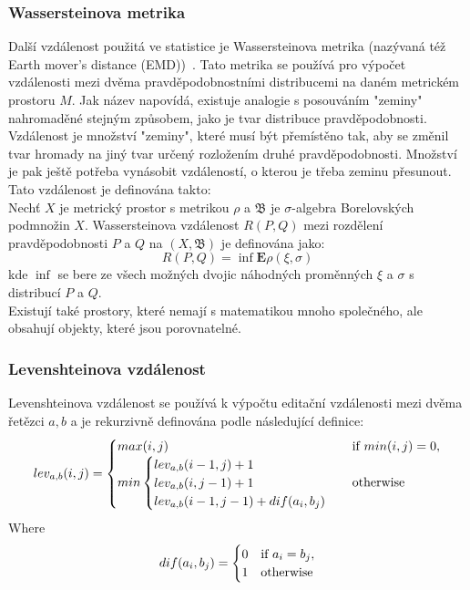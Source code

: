 \subsubsection{Wassersteinova metrika}
Další vzdálenost použitá ve statistice je Wassersteinova metrika (nazývaná též Earth mover's distance (EMD))~\cite{Vallender73}. Tato metrika se používá pro výpočet vzdá\-le\-nos\-ti mezi dvěma pravděpodobnostními distribucemi na daném metrickém prostoru $M$. Jak název napovídá, existuje analogie s posouváním "zeminy" nahromaděné stejným způsobem, jako je tvar distribuce pravděpodobnosti. Vzdálenost je množství "zeminy", které musí být přemístěno tak, aby se změnil tvar hromady na jiný tvar určený rozložením druhé pravděpodobnosti. Množství je pak ještě potřeba vynásobit vzdáleností, o kterou je třeba zeminu přesunout. Tato vzdálenost je definována takto: \\
Nechť $X$ je metrický prostor s metrikou $\rho$ a $\mathfrak {B}$ je $\sigma$-algebra Borelovských podmnožin $X$. Wassersteinova vzdálenost $R(P, Q)$ mezi rozdělení pravděpodobnosti $P$ a $Q$ na $(X, \mathfrak{B}) $ je definována jako:
$$R(P,Q)=\inf\mathbf{E}\rho(\xi, \sigma)$$
kde $\inf$ se bere  ze všech možných dvojic náhodných proměnných $\xi$ a $\sigma$ s distribucí $P$ a $Q$.\\

Existují také prostory, které nemají s matematikou mnoho společného, ale obsahují objekty, které jsou porovnatelné.

\subsubsection{Levenshteinova vzdálenost} Levenshteinova vzdálenost se používá k výpočtu editační vzdálenosti mezi dvěma řetězci $ a, b $ a je rekurzivně definována podle následující definice:
\begin{equation*}
lev_{a,b}(i,j)=
\begin{cases}
max(i,j) & $if $ min(i,j)=0, \cr
min \begin{cases}
lev_{a,b}(i-1,j) + 1 \cr
lev_{a,b}(i,j-1) + 1 \cr
lev_{a,b}(i-1,j-1) + dif(a_i,b_j)
\end{cases} & $otherwise$
\end{cases}
\end{equation*}
Where \begin{equation*}
dif(a_i,b_j)=
\begin{cases}
0 & $if $ a_i = b_j, \cr
1 & $otherwise$
\end{cases}
\end{equation*}


